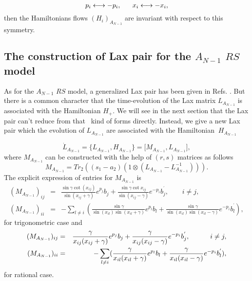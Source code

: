 \documentclass[a4paper,12pt]{article}
\begin{document}
\begin{equation}
p_{i}\longleftrightarrow -p_{i},\mbox{$ \ \ \ \ \ $}x_{i}\longleftrightarrow
-x_{i},	 \label{sym}
\end{equation}
then the Hamiltonians flows $(H_{i})_{A_{N-1}}$ are invariant with respect
to this symmetry.

\subsection{The construction of Lax pair for the $A_{N-1}$ $RS$ model}

As for the $A_{N-1}$ $RS$ model, a generalized Lax pair has been given in Refs.
\cite{r1, nksr, bc, kz, s1, s2}. But there is a common character that the
time-evolution of the Lax matrix $L_{A_{N-1}}$ is associated with the
Hamiltonian $H_{+}$. We will see in the next section that the Lax pair can't
reduce from that \ kind of forms directly. Instead, we give a new Lax pair
which the evolution of $L_{A_{N-1}}$ are associated with the Hamiltonian $\
H_{A_{N-1}}$

\begin{equation}
\dot{L}_{A_{N-1}}=\{L_{A_{N-1}},H_{A_{N-1}}\}=\lbrack
M_{A_{N-1}},L_{A_{N-1}}\rbrack ,  \label{laxeq}
\end{equation}
where $M_{A_{N-1}}$ can be constructed with the help of $(r,s)$ matrices as
follows
\begin{equation}
M_{A_{N-1}}=Tr_{2}((s_{1}-a_{2})(1\otimes (L_{A_{N-1}}-L_{A_{N-1}}^{-1}))).
\end{equation}
The explicit expression of  entries for	 $M_{A_{N-1}}$ is
\begin{eqnarray}
(M_{A_{N-1}})_{ij} &=&\frac{\sin \gamma \cot (x_{ij})}{\sin (x_{ij}+\gamma )}%
e^{p_{j}}b_{j}+\frac{\sin \gamma \cot x_{ij}}{\sin (x_{ij}-\gamma )}%
e^{-p_{i}}b_{j}^{^{\prime }},\ \ \ \ \ \ \ \ \ i\neq j,	 \nonumber \\
(M_{A_{N-1}})_{ii} &=&-\sum_{l\neq i}(\frac{\sin \gamma }{\sin (x_{il})\sin
(x_{il}+\gamma )}e^{p_{l}}b_{l}+\frac{\sin \gamma }{\sin (x_{il})\sin
(x_{il}-\gamma )}e^{-p_{i}}b_{l}^{^{\prime }}),
\end{eqnarray}
for trigonometric case and
\begin{eqnarray}
(M_{A_{N-1}})_{ij} &=&\frac{\gamma }{x_{ij}(x_{ij}+\gamma )}e^{p_{j}}b_{j}+%
\frac{\gamma }{x_{ij}(x_{ij}-\gamma )}e^{-p_{i}}b_{j}^{^{\prime }},\ \ \ \ \
\ \ \ \ i\neq j,  \nonumber \\
(M_{A_{N-1}})_{ii} &=&-\sum_{l\neq i}(\frac{\gamma }{x_{il}(x_{il}+\gamma )}%
e^{p_{l}}b_{l}+\frac{\gamma }{x_{il}(x_{il}-\gamma )}e^{-p_{i}}b_{l}^{^{%
\prime }}),
\end{eqnarray}
for rational case.
\end{document}
